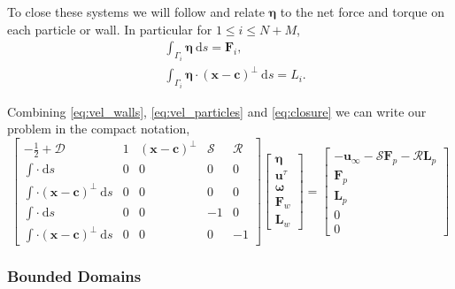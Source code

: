 \documentclass[preprint, 10pt]{elsarticle}
\begin{document}
To close these systems we will follow \cite{Power1993} and relate
$\pmb{\eta}$ to the net force and torque on each particle or wall. In
particular for $1\leq i \leq N+M$,
\begin{subequations}\label{eq:closure}
\begin{align}
	&\int_{\Gamma_i} \pmb{\eta}~\text{d}s = \mathbf{F}_i,\\
	&\int_{\Gamma_i} \pmb{\eta}\cdot (\mathbf{x} - \mathbf{c})^\perp~\text{d}s = L_i.
\end{align} 
\end{subequations}

Combining \eqref{eq:vel_walls}, \eqref{eq:vel_particles} and \eqref{eq:closure} we can write our problem in the compact notation,
\begin{equation}\label{eq:stokes_unbounded} \begin{bmatrix} -\frac{1}{2} + \mathcal{D} & 1 & (\mathbf{x}-\mathbf{c})^\perp & \mathcal{S} & \mathcal{R}\\
		\int \cdot~ \text{d}s & 0 & 0 & 0 & 0\\
		\int\cdot(\mathbf{x}-\mathbf{c})^\perp~\text{d}s & 0 & 0 & 0 & 0\\
		\int \cdot~ \text{d}s & 0 & 0 & - 1 & 0\\
		\int\cdot(\mathbf{x}-\mathbf{c})^\perp~\text{d}s & 0 & 0 & 0 & -1\end{bmatrix}
\begin{bmatrix}
	\pmb{\eta}\\\mathbf{u}^\tau \\ \pmb{\omega} \\ \mathbf{F}_w \\\mathbf{ L}_w
\end{bmatrix}
=
\begin{bmatrix}
	-\mathbf{u}_{\infty} - \mathcal{S}\mathbf{F}_p - \mathcal{R}\mathbf{L}_p\\
	\mathbf{F}_p\\
	\mathbf{L}_p\\
	0\\
	0
\end{bmatrix}
\end{equation}

\subsubsection{Bounded Domains}
\end{document}
